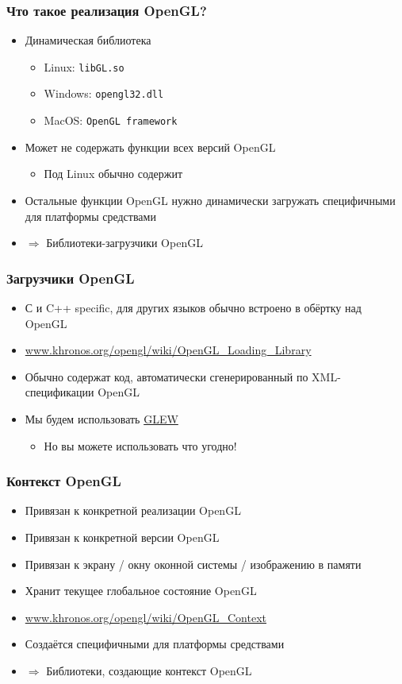 \documentclass{beamer}
\begin{document}
\begin{frame}[fragile]
\frametitle{Что такое реализация OpenGL?}
\begin{itemize}
\item Динамическая библиотека
\begin{itemize}
\item Linux: \verb|libGL.so|
\item Windows: \verb|opengl32.dll|
\item MacOS: \verb|OpenGL framework|
\end{itemize}
\pause
\item Может не содержать функции всех версий OpenGL
\begin{itemize}
\item Под Linux обычно содержит
\end{itemize}
\item Остальные функции OpenGL нужно динамически загружать специфичными для платформы средствами
\item $\Longrightarrow$ Библиотеки-загрузчики OpenGL
\end{itemize}
\end{frame}

\begin{frame}
\frametitle{Загрузчики OpenGL}
\begin{itemize}
\item С и C++ specific, для других языков обычно встроено в обёртку над OpenGL
\item \url{www.khronos.org/opengl/wiki/OpenGL_Loading_Library}
\item Обычно содержат код, автоматически сгенерированный по XML-спецификации OpenGL
\item Мы будем использовать {\color{blue}\underline{GLEW}}
\begin{itemize}
\item Но вы можете использовать что угодно!
\end{itemize}
\end{itemize}
\end{frame}

\begin{frame}
\frametitle{Контекст OpenGL}
\begin{itemize}
\item Привязан к конкретной реализации OpenGL
\item Привязан к конкретной версии OpenGL
\item Привязан к экрану / окну оконной системы / изображению в памяти
\item Хранит текущее глобальное состояние OpenGL
\item \url{www.khronos.org/opengl/wiki/OpenGL_Context}
\item Создаётся специфичными для платформы средствами
\item $\Longrightarrow$ Библиотеки, создающие контекст OpenGL
\end{itemize}
\end{frame}
\end{document}

